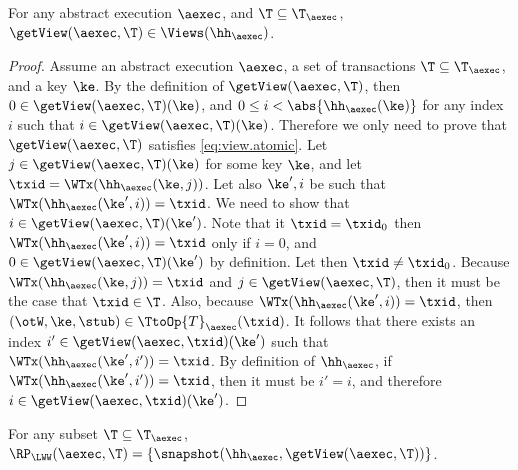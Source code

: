 \begin{proposition}
\label{prop:getview.valid}
For any abstract execution $\aexec$, and $\T \subseteq \T_{\aexec}$, 
$\getView(\aexec, \T) \in \Views(\hh_{\aexec})$.
\end{proposition}
\begin{proof}
Assume an abstract execution $\aexec$, a set of transactions $\T \subseteq \T_{\aexec}$, and a key \( \ke \).
By the definition of $\getView(\aexec, \T)$, 
then $0 \in \getView(\aexec, \T)(\ke)$, and 
$0 \leq i < \abs{ \hh_{\aexec}(\ke) }$ for any index \( i \) such that $i \in \getView(\aexec, \T)(\ke)$.
Therefore we only need to prove that $\getView(\aexec, \T)$ satisfies \eqref{eq:view.atomic}.
Let $j \in \getView(\aexec, \T)(\ke)$ for some key $\ke$, and let $\txid = 
\WTx(\hh_{\aexec}(\ke, j))$. Let also $\ke', i$ be such that 
$\WTx(\hh_{\aexec}(\ke', i)) = \txid$. We need to show that 
$i \in \getView(\aexec, \T)(\ke')$. Note that it $\txid = \txid_{0}$ 
then $\WTx(\hh_{\aexec}(\ke', i)) = \txid$ only if $i = 0$, and 
$0 \in \getView(\aexec, \T)(\ke')$ by definition. 
Let then $\txid \neq \txid_{0}$. Because $\WTx(\hh_{\aexec}(\ke, j)) = \txid$ 
and $j \in \getView(\aexec, \T)$, then it must be the case that $\txid \in \T$. 
Also, because $\WTx(\hh_{\aexec}(\ke', i)) = \txid$, then $(\otW, \ke, \stub) \in 
\TtoOp{T}_{\aexec}(\txid)$. It follows that there exists an index $i' \in \getView(\aexec, \txid)(\ke')$ 
such that $\WTx(\hh_{\aexec}(\ke', i')) = \txid$. By definition of 
$\hh_{\aexec}$, if $\WTx(\hh_{\aexec}(\ke', i')) = \txid$, then it must 
be $i' = i$, and therefore $i \in \getView(\aexec, \txid)(\ke')$.
\end{proof}


\begin{proposition}
\label{prop:compatible.aexec2kv}
For any subset $\T \subseteq \T_{\aexec}$, $\RP_{\LWW}(\aexec, \T) = \{\snapshot(\hh_{\aexec}, \getView(\aexec, \T))\}$.
\end{proposition}

